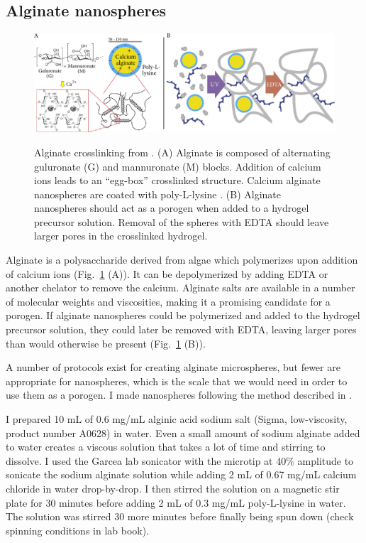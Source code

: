 \subsection{Alginate nanospheres}
\begin{figure}
\caption{Alginate crosslinking from \cite{bruchet15}.  (A) Alginate is composed of alternating guluronate (G) and mannuronate (M) blocks.  Addition of calcium ions leads to an ``egg-box'' crosslinked structure. Calcium alginate nanospheres are coated with poly-L-lysine \cite{de03}.  (B) Alginate nanospheres should act as a porogen when added to a hydrogel precursor solution.  Removal of the spheres with EDTA should leave larger pores in the crosslinked hydrogel.}
\centering
\includegraphics[width=\textwidth]{figs/ch03/alginate-cartoon2}
\label{fig:alginate}
\end{figure}

Alginate is a polysaccharide derived from algae which polymerizes upon addition of calcium ions (Fig.~\ref{fig:alginate} (A)).  It can be depolymerized by adding EDTA or another chelator to remove the calcium.  Alginate salts are available in a number of molecular weights and viscosities, making it a promising candidate for a porogen.  If alginate nanospheres could be polymerized and added to the hydrogel precursor solution, they could later be removed with EDTA, leaving larger pores than would otherwise be present (Fig.~\ref{fig:alginate} (B)).

A number of protocols exist for creating alginate microspheres, but fewer are appropriate for nanospheres, which is the scale that we would need in order to use them as a porogen.  I made nanospheres following the method described in \cite{de03}.

I prepared 10 mL of 0.6 mg/mL alginic acid sodium salt (Sigma, low-viscosity, product number A0628) in water.  Even a small amount of sodium alginate added to water creates a viscous solution that takes a lot of time and stirring to dissolve.  I used the Garcea lab sonicator with the microtip at 40\% amplitude to sonicate the sodium alginate solution while adding 2 mL of 0.67 mg/mL calcium chloride in water drop-by-drop.  I then stirred the solution on a magnetic stir plate for 30 minutes before adding 2 mL of 0.3 mg/mL poly-L-lysine in water.  The solution was stirred 30 more minutes before finally being spun down (check spinning conditions in lab book).

